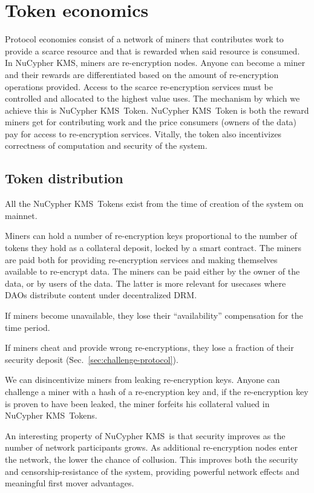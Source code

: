 \documentclass[longbibliography]{revtex4-1}
\newcommand{\kms}{NuCypher KMS}
\begin{document}
\section{Token economics}
\label{sec:token}

Protocol economies consist of a network of miners that contributes work to provide a scarce resource and that is
rewarded when said resource is consumed.
In \kms, miners are re-encryption nodes.
Anyone can become a miner and their rewards are differentiated based on the amount of re-encryption operations provided.
Access to the scarce re-encryption services must be controlled and allocated to the highest value uses.
The mechanism by which we achieve this is \kms~Token. \kms~Token is both the reward miners get for contributing
work and the price consumers (owners of the data) pay for access to re-encryption services.
Vitally, the token also incentivizes correctness of computation and security of the system.

\subsection{Token distribution}

All the \kms~Tokens exist from the time of creation of the system on mainnet.

Miners can hold a number of re-encryption keys proportional to the number of tokens they hold as a collateral deposit, locked by a smart contract.
The miners are paid both for providing re-encryption services and making themselves available to re-encrypt data.
The miners can be paid either by the owner of the data, or by users of the data.
The latter is more relevant for usecases where DAOs distribute content under decentralized DRM.

If miners become unavailable, they lose their ``availability'' compensation for the time period.

If miners cheat and provide wrong re-encryptions, they lose a fraction of their security deposit (Sec.~\ref{sec:challenge-protocol}).

We can disincentivize miners from leaking re-encryption keys.
Anyone can challenge a miner with a hash of a re-encryption key and, if the re-encryption key is proven to have been leaked, the miner forfeits his collateral valued in \kms~Tokens.

An interesting property of \kms~is that security improves as the number of network participants grows. As additional re-encryption
nodes enter the network, the lower the chance of collusion.
This improves both the security and censorship-resistance of the system, providing powerful network effects and meaningful first mover advantages.
\end{document}
